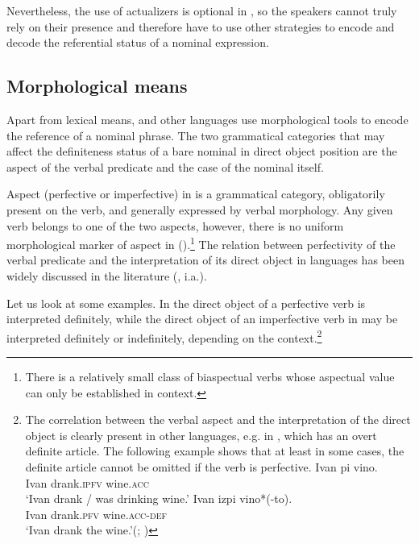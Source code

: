 \documentclass[output=paper]{langscibook}
\begin{document}
\noindent Nevertheless, the use of actualizers is optional in , so the speakers cannot truly rely on their presence and therefore have to use other strategies to encode and decode the referential status of a nominal expression. %

\subsection{%
Morphological means}
Apart from lexical means,  and other  languages use %
 morphological tools to encode the reference of a nominal phrase. The two grammatical categories that may affect the definiteness status of a bare nominal in direct object position are the aspect of the verbal predicate and the case of the nominal itself.

Aspect (perfective or imperfective) in  is a grammatical category, obligatorily present on the %
verb, and generally expressed by verbal morphology. Any given verb belongs to one of the two aspects, however, there is no uniform morphological marker of aspect in  (\citealt{Klein1995,Borik2006}).\footnote{There is a relatively small class of biaspectual verbs whose aspectual value can only be established in  context.} The relation between perfectivity of the verbal predicate and the interpretation of its direct object in  languages has been widely discussed in the literature (\citealt{Wierzbicka1967,Krifka1992,Schoorlemmer1995,Verkuyl1999,Filip1993}, i.a.).

Let us look at some examples. In  the direct object of a perfective verb is interpreted definitely, while the direct object of an imperfective verb in  may be interpreted definitely or indefinitely, depending on the context.\footnote{The correlation between the verbal aspect and the interpretation of the direct object is clearly present in other  languages, e.g. in , which has an overt definite article. The following example shows that at least in some cases, the definite article cannot be omitted if the verb is perfective.
\ea
\ea \label{ex:seres:ia}
\gll	Ivan 	pi 					vino.\\
		Ivan 	drank.\textsc{ipfv} 	wine.\textsc{acc}\\
\glt		`Ivan drank / was drinking wine.'
\ex \label{ex:seres:ib}
\gll Ivan 	izpi 				vino*(-to).\\
		Ivan 	drank.\textsc{pfv} 	wine.\textsc{acc}-\textsc{def}\\
\glt `Ivan drank the wine.'\hfill (; \citealt[944]{Dimitrova-Vulchanova2012})
\z \z
}
\end{document}
